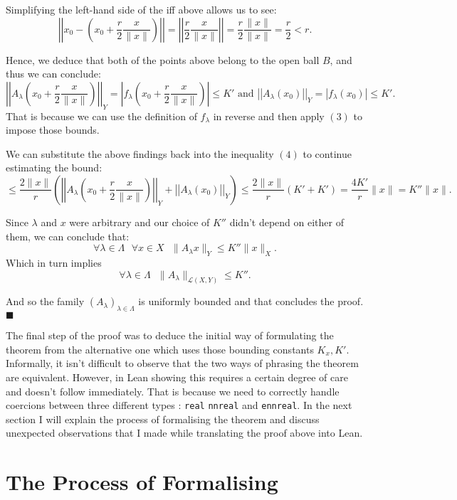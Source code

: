 \documentclass[11pt]{article}
\newcommand\sep{\text{ }}
\begin{document}
Simplifying the left-hand side of the iff above allows us to see:
\[
\left|\left|x_0 - \left(x_0 + \frac{r}{2}\frac{x}{\|x\|}   \right) \right|\right| =
\left|\left| \frac{r}{2}\frac{x}{\|x\|}\right|\right| = \frac{r}{2} \frac{\|x\|}{\|x\|} = \frac{r}{2}  < r
.\]

Hence, we deduce that both of the points above belong to the open ball $B$, and
thus we can conclude:
\[
  \left|\left| A_\lambda\left( x_0 + \frac{r}{2}\frac{x}{\|x\|} \right)\right|\right|_Y = \left| f_\lambda\left( x_0 + \frac{r}{2}\frac{x}{\|x\|} \right)\right| \le K' \text{ and }
\left|\left| A_\lambda(x_0)  \right|\right|_Y = \left| f_\lambda(x_0)  \right| \le K'
.\]
That is because we can use the definition of $f_\lambda$ in reverse and then apply
 $(3)$ to impose those bounds.

 We can substitute the above findings back into the inequality $(4)$ to continue
 estimating the bound:
 \[
 \le \frac{2\|x\|}{r} \left( \left|\left| A_\lambda\left( x_0 + \frac{r}{2}\frac{x}{\|x\|} \right)
 \right|\right|_Y + \left|\left| A_\lambda(x_0)  \right|\right|_Y \right)
 \le \frac{2\|x\|}{r} \left( K' + K'\right) = \frac{4K'}{r}\|x\| = K''\|x\|
 .\]

 Since $\lambda$ and  $x$ were arbitrary and our choice of $K''$ didn't depend on either
 of them, we can conclude that:
\[
   \forall \lambda \in \Lambda \sep \forall x \in X \sep \|A_\lambda x\|_Y \le K'' \|x\|_X
.\]
Which in turn implies
\[
\forall \lambda \in \Lambda \sep \|A_\lambda\|_{\mathcal{L}\left( X, Y \right)}  \le K''.\]

And so the family $\left( A_\lambda \right)_{\lambda \in \Lambda} $ is uniformly
bounded and that concludes the proof. \hfill $\blacksquare$

The final step of the proof was to deduce the initial way of formulating the theorem
from the alternative one which uses those bounding constants $K_x, K'$. Informally,
it isn't difficult to observe that the two ways of phrasing the theorem are equivalent.
However, in Lean showing this requires a certain degree of care and doesn't follow
immediately. That is because we need to correctly handle coercions between three different
types : \texttt{real} \texttt{nnreal} and \texttt{ennreal}. In the next section I will explain the process of formalising the
theorem and discuss unexpected observations that I made while translating the proof
above into Lean.


\section*{The Process of Formalising}
\end{document}
